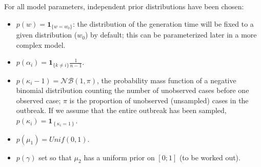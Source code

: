 \documentclass[10pt]{article}
\begin{document}
For all model parameters, independent prior distributions have been chosen:
\begin{itemize}
	\item $p(w) = \mathbf{1}_{\{w=w_0\}}$: the distribution of the generation time will be fixed to a given distribution ($w_0$) by default; this can be parameterized later in a more complex model.
	\item $p(\alpha_i) = \mathbf{1}_{\{k\neq i\}}\frac{1}{n-1}$.
	\item $p(\kappa_i - 1) = \mathcal{NB}(1,\pi)$, the probability mass function of a negative binomial distribution counting the number of unobserved cases before one observed case; $\pi$ is the proportion of unobserved (unsampled) cases in the outbreak. If we assume that the entire outbreak has been sampled, $p(\kappa_i) = \mathbf{1}_{\left\lbrace \kappa_i=1\right\rbrace}$.
	\item $p(\mu_1) = Unif(0,1)$.
	\item $p(\gamma) $ set so that $\mu_2$ has a uniform prior on $[0;1]$ (to be worked out). 
\end{itemize}






%   
% 
\end{document}
